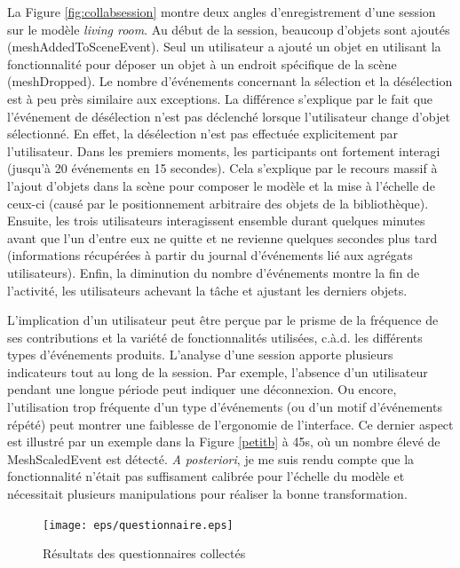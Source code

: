 La Figure \ref{fig:collabsession} montre deux angles d'enregistrement d'une session 
sur le modèle \textit{living room}. Au début de la session, beaucoup d'objets sont 
ajoutés (meshAddedToSceneEvent). Seul un utilisateur a ajouté un objet en 
utilisant la fonctionnalité pour déposer un objet à un endroit spécifique de la scène 
(meshDropped). Le nombre d'événements concernant la sélection et 
la désélection est à peu près similaire aux exceptions. La différence s'explique par 
le fait que l'événement de désélection n'est pas déclenché lorsque l'utilisateur change
d'objet sélectionné. En effet, la désélection n'est pas effectuée explicitement par 
l'utilisateur. Dans les premiers moments, les participants ont fortement interagi 
(jusqu'à 20 événements en 15 secondes). Cela s'explique par le recours massif à l'ajout 
d'objets dans la scène pour composer le modèle et la mise à l'échelle de ceux-ci 
(causé par le positionnement arbitraire des objets de la bibliothèque). 
Ensuite, les trois utilisateurs interagissent ensemble durant quelques
minutes avant que l'un d'entre 
eux ne quitte et ne revienne quelques secondes plus tard (informations 
récupérées à partir du journal d'événements lié aux agrégats utilisateurs). Enfin, la diminution du nombre d'événements montre la fin de l'activité, les utilisateurs achevant 
la tâche et ajustant les derniers objets.

L'implication d'un utilisateur peut être perçue par le prisme de la fréquence de ses 
contributions et la variété de fonctionnalités utilisées, c.à.d. les différents 
types d'événements produits. L'analyse d'une session apporte plusieurs indicateurs 
tout au long de la session. Par exemple, l'absence d'un utilisateur pendant une 
longue période peut indiquer une déconnexion. Ou encore, l'utilisation trop 
fréquente d'un type d'événements (ou d'un motif d'événements répété) peut montrer 
une faiblesse de l'ergonomie de l'interface. Ce dernier aspect est illustré par un exemple dans la Figure \ref{petitb} à 45s, où un nombre élevé de 
MeshScaledEvent est détecté. \textit{A posteriori}, je me suis rendu compte que la 
fonctionnalité n'était pas suffisament calibrée pour l'échelle du modèle et nécessitait plusieurs manipulations pour réaliser la bonne transformation.

	\begin{figure}[]
		\centering
		\texttt{[image: eps/questionnaire.eps]} 
		\caption{Résultats des questionnaires collectés}
		\label{fig:questionnaire}
	\end{figure}


